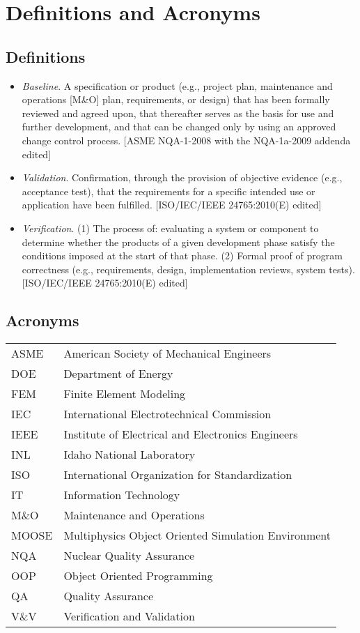 \documentclass{INLreport}
\begin{document}
\section{Definitions and Acronyms}

\subsection{Definitions}

\begin{itemize}
\item \textit{Baseline}. A specification or product (e.g., project plan, maintenance and operations [M\&O] plan, requirements, or design) that has been formally reviewed and agreed upon, that thereafter serves as the basis for use and further development, and that can be changed only by using an approved change control process. [ASME NQA-1-2008 with the NQA-1a-2009 addenda edited]

\item \textit{Validation}. Confirmation, through the provision of objective evidence (e.g., acceptance test), that the requirements for a specific intended use or application have been fulfilled. [ISO/IEC/IEEE 24765:2010(E) edited]

\item \textit{Verification}. (1) The process of: evaluating a system or component to determine whether the products of a given development phase satisfy the conditions imposed at the start of that phase. (2) Formal proof of program correctness (e.g., requirements, design, implementation reviews, system tests). [ISO/IEC/IEEE 24765:2010(E) edited]
\end{itemize}

\subsection{Acronyms}

\begin{tabular}{l l}
  ASME    & American Society of Mechanical Engineers \\
  DOE     & Department of Energy \\
  FEM     & Finite Element Modeling \\
  IEC     & International Electrotechnical Commission \\
  IEEE    & Institute of Electrical and Electronics Engineers \\
  INL     & Idaho National Laboratory \\
  ISO     & International Organization for Standardization \\
  IT      & Information Technology \\
  M\&O    & Maintenance and Operations \\
  MOOSE   & Multiphysics Object Oriented Simulation Environment \\
  NQA     & Nuclear Quality Assurance \\
  OOP     & Object Oriented Programming \\
  QA      & Quality Assurance \\
  V\&V    & Verification and Validation \\
\end{tabular}
\end{document}
